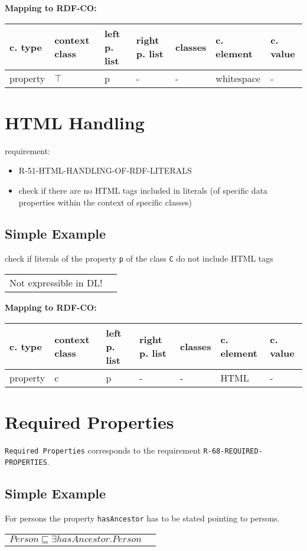 \documentclass{llncs}
\newcommand{\ms}[1]{\texttt{#1}}
\newenvironment{gcotable}{
  \scriptsize
  \sffamily
  \vspace{0cm}
	\begin{center}
	\textbf{\vspace{0.4cm}Mapping to RDF-CO:} \\
  \begin{tabular}{l|l|l|l|l|l|l}
	\hline
  \textbf{c. type} & \textbf{context class} & \textbf{left p. list} & \textbf{right p. list} & \textbf{classes} & \textbf{c. element} & \textbf{c. value} \\
  \hline

}{
  \hline
  \end{tabular}
	\end{center}
}
\newenvironment{DL}{
  \vspace{0cm}
	\begin{center}
  \begin{tabular}{r l}

}{
  \end{tabular}
	\end{center}
}
\begin{document}
\begin{gcotable}
property & $\top$ & p & - & - & whitespace & - \\
\end{gcotable}

\section{HTML Handling}

requirement:

\begin{itemize}
	\item R-51-HTML-HANDLING-OF-RDF-LITERALS
\end{itemize}

\begin{itemize}
	\item check if there are no HTML tags included in literals (of specific data properties within the context of specific classes)
\end{itemize}

\subsection{Simple Example}

check if literals of the property \ms{p} of the class \ms{C} do not include HTML tags

\begin{DL}
Not expressible in DL!
\end{DL}

\begin{gcotable}
property & c & p & - & - & HTML & - \\
\end{gcotable}

\section{Required Properties}

\ms{Required Properties} corresponds to the requirement \ms{R-68-REQUIRED-PROPERTIES}.

\subsection{Simple Example}

For persons the property \ms{hasAncestor} has to be stated pointing to persons.

\begin{DL}
$Person \sqsubseteq \exists hasAncestor.Person$
\end{DL}
\end{document}
